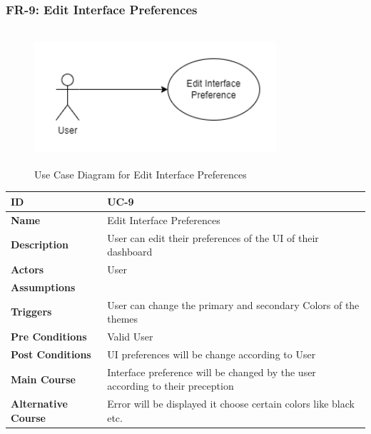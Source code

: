     \subsubsection{FR-9: Edit Interface Preferences}
    \begin{figure}[H]
        \includegraphics[height=5cm, width=0.8\textwidth]{./diagrams/Use Case/u9.png}
        \centering 
        \caption{Use Case Diagram for Edit Interface Preferences}
        \label{fig:Usecase1}
        \end{figure}
        
    \begin{center}
        \begin{tabularx}{\textwidth}{|l|X|}
            \hline
            \textbf{ID} & UC-9 \\
            \hline
            \textbf{Name} & Edit Interface Preferences \\
            \hline
            \textbf{Description} & User can edit their preferences of the UI of their dashboard \\
            \hline
            \textbf{Actors} & User \\
            \hline
            \textbf{Assumptions} &  \\
            \hline
            \textbf{Triggers} & User can change the primary and secondary Colors of the themes \\
            \hline
            \textbf{Pre Conditions} & Valid User \\
            \hline
            \textbf{Post Conditions} & UI preferences will be change according to User \\
            \hline
            \textbf{Main Course} & Interface preference will be changed by the user according to their preception  \\
            \hline
            \textbf{Alternative Course} & Error will be displayed it choose certain colors like black etc. \\
            \hline
            
        \end{tabularx}
    \end{center}
    \newpage
    

